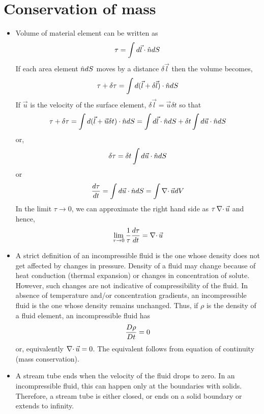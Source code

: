 \section{Conservation of mass}\label{s2}
\begin{itemize}
\item Volume of material element can be written as
\[
\tau = \int d\vec{l}\cdot\hat{n} dS
\]
If each area element $\hat{n} dS$ moves by a distance $\delta\vec{l}$ then the volume becomes,
\[
\tau + \delta\tau = \int d(\vec{l} + \delta\vec{l})\cdot\hat{n} dS
\]
If $\vec{u}$ is the velocity of the surface element, $\delta\vec{l} = \vec{u}\delta t$ so that
\[
\tau + \delta\tau = \int d(\vec{l} + \vec{u}\delta t)\cdot\hat{n} dS = \int d\vec{l}\cdot\hat{n} dS + \delta{t}\int d\vec{u}\cdot\hat{n} dS
\]
or,
\[
\delta\tau = \delta{t}\int d\vec{u}\cdot\hat{n} dS
\]
or
\[
\frac{d{\tau}}{d{t}} = \int d\vec{u}\cdot\hat{n} dS = \int\operatorname{\nabla\cdot}\vec{u}dV
\]
In the limit $\tau \rightarrow 0$, we can approximate the right hand side as $\tau\operatorname{\nabla\cdot}{\vec{u}}$ and hence,
\begin{equation}\label{c2s2e1}
\lim_{\tau \rightarrow 0} \frac{1}{\tau}\frac{d{\tau}}{d{t}} = \operatorname{\nabla\cdot}{\vec{u}}
\end{equation}

\item A strict definition of an incompressible fluid is the one whose density does not get affected by changes in pressure. Density of a fluid may change because of heat conduction 
(thermal expansion) or changes in concentration of solute. However, such changes are not indicative of compressibility of the fluid. In absence of temperature and/or concentration 
gradients, an incompressible fluid is the one whose density remains unchanged. Thus, if $\rho$ is the density of a fluid element, an incompressible fluid has
\[
\frac{D{\rho}}{Dt} = 0
\]
or, equivalently $\operatorname{\nabla\cdot}{\vec{u}} = 0$. The equivalent follows from equation of continuity (mass conservation).

\item A stream tube ends when the velocity of the fluid drops to zero. In an incompressible fluid, this can happen only at the boundaries with solids. Therefore, a stream tube is either 
closed, or ends on a solid boundary or extends to infinity.


\end{itemize}

